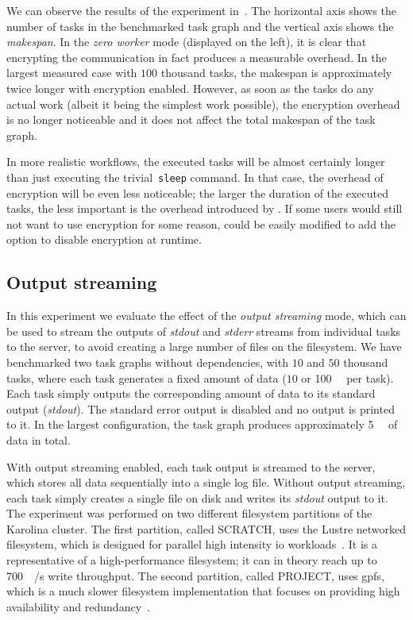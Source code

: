 We can observe the results of the experiment in~. The horizontal axis shows
the number of tasks in the benchmarked task graph and the vertical axis shows the
\emph{makespan}. In the \emph{zero worker} mode (displayed on the left), it is clear
that encrypting the communication in fact produces a measurable overhead. In the largest measured
case with $100$ thousand tasks, the makespan is approximately twice longer with
encryption enabled. However, as soon as the tasks do any actual work (albeit it being the simplest
work possible), the encryption overhead is no longer noticeable and it does not affect the total
makespan of the task graph.

In more realistic workflows, the executed tasks will be almost certainly longer than just executing
the trivial~\texttt{sleep} command. In that case, the overhead of encryption will be even
less noticeable; the larger the duration of the executed tasks, the less important is the overhead
introduced by \hyperqueue{}. If some users would still not want to use encryption for
some reason, \hyperqueue{} could be easily modified to add the option to disable
encryption at runtime.

\subsection{Output streaming}
\label{sec:hq-exp-output-streaming}
In this experiment we evaluate the effect of the \emph{output streaming} mode, which can be used to
stream the outputs of \emph{stdout} and \emph{stderr} streams from individual
tasks to the \hyperqueue{} server, to avoid creating a large number of files on the
filesystem. We have benchmarked two task graphs without dependencies, with $10$
and $50$ thousand tasks, where each task generates a fixed amount of data
($10$ or \SI{100}{\kibi\byte} per task). Each task simply outputs the
corresponding amount of data to its standard output (\emph{stdout}). The standard error
output is disabled and no output is printed to it. In the largest configuration, the task graph
produces approximately \SI{5}{\gibi\byte} of data in total.

With output streaming enabled, each task output is streamed to the server, which stores all data
sequentially into a single log file. Without output streaming, each task simply creates a single
file on disk and writes its \emph{stdout} output to it. The experiment was performed on
two different filesystem partitions of the Karolina cluster. The first partition, called SCRATCH,
uses the Lustre networked filesystem, which is designed for parallel high intensity
\gls{io} workloads~\cite{karolina_scratch}. It is a representative of a
high-performance filesystem; it can in theory reach up to \SI{700}{\gibi\byte}/s write
throughput. The second partition, called PROJECT, uses \gls{gpfs}, which is a much
slower filesystem implementation that focuses on providing high availability and
redundancy~\cite{karolina_project}.

